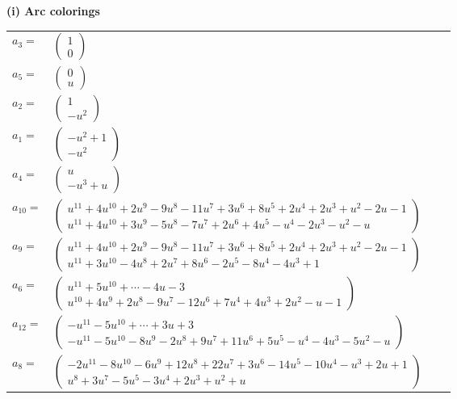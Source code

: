 \documentclass[1p]{elsarticle_modified}
\theoremstyle{definition}
\begin{document}
\flushleft \textbf{(i) Arc colorings}\\
\begin{tabular}{m{7pt} m{180pt} m{7pt} m{180pt} }
\flushright $a_{3}=$&$\begin{pmatrix}1\\0\end{pmatrix}$ \\
\flushright $a_{5}=$&$\begin{pmatrix}0\\u\end{pmatrix}$ \\
\flushright $a_{2}=$&$\begin{pmatrix}1\\- u^2\end{pmatrix}$ \\
\flushright $a_{1}=$&$\begin{pmatrix}- u^2+1\\- u^2\end{pmatrix}$ \\
\flushright $a_{4}=$&$\begin{pmatrix}u\\- u^3+u\end{pmatrix}$ \\
\flushright $a_{10}=$&$\begin{pmatrix}u^{11}+4 u^{10}+2 u^9-9 u^8-11 u^7+3 u^6+8 u^5+2 u^4+2 u^3+u^2-2 u-1\\u^{11}+4 u^{10}+3 u^9-5 u^8-7 u^7+2 u^6+4 u^5- u^4-2 u^3- u^2- u\end{pmatrix}$ \\
\flushright $a_{9}=$&$\begin{pmatrix}u^{11}+4 u^{10}+2 u^9-9 u^8-11 u^7+3 u^6+8 u^5+2 u^4+2 u^3+u^2-2 u-1\\u^{11}+3 u^{10}-4 u^8+2 u^7+8 u^6-2 u^5-8 u^4-4 u^3+1\end{pmatrix}$ \\
\flushright $a_{6}=$&$\begin{pmatrix}u^{11}+5 u^{10}+\cdots-4 u-3\\u^{10}+4 u^9+2 u^8-9 u^7-12 u^6+7 u^4+4 u^3+2 u^2- u-1\end{pmatrix}$ \\
\flushright $a_{12}=$&$\begin{pmatrix}- u^{11}-5 u^{10}+\cdots+3 u+3\\- u^{11}-5 u^{10}-8 u^9-2 u^8+9 u^7+11 u^6+5 u^5- u^4-4 u^3-5 u^2- u\end{pmatrix}$ \\
\flushright $a_{8}=$&$\begin{pmatrix}-2 u^{11}-8 u^{10}-6 u^9+12 u^8+22 u^7+3 u^6-14 u^5-10 u^4- u^3+2 u+1\\u^8+3 u^7-5 u^5-3 u^4+2 u^3+u^2+u\end{pmatrix}$ \\

\end{tabular}
\end{document}
